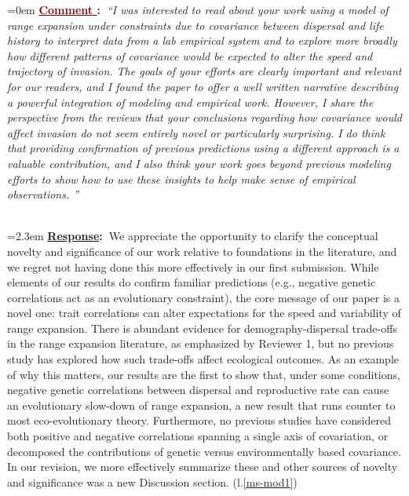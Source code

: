 \documentclass[12pt]{article}
\newcounter{cN}
\newcommand{\comment}[1]{
	\vspace{2em}
	\refstepcounter{cN} %
	\noindent \hangindent=0em \textbf{\textcolor{Maroon}{\uline{Comment \thecN}:~}}\emph{``#1''}
	}
\newcommand{\response}[1]{
	\\[0.25em]
	\hangindent=2.3em \textbf{\textcolor{NavyBlue}{\uline{Response}:~}}#1
	}
\begin{document}
\comment{I was interested to read about your work using a model of range expansion under constraints due to covariance between dispersal and life history to interpret data from a lab empirical system and to explore more broadly how different patterns of covariance would be expected to alter the speed and trajectory of invasion.
The goals of your efforts are clearly important and relevant for our readers, and I found the paper to offer a well written narrative describing a powerful integration of modeling and empirical work.
However, I share the perspective from the reviews that your conclusions regarding how covariance would affect invasion do not seem entirely novel or particularly surprising.
I do think that providing confirmation of previous predictions using a different approach is a valuable contribution, and I also think your work goes beyond previous modeling efforts to show how to use these insights to help make sense of empirical observations. }
\response{We appreciate the opportunity to clarify the conceptual novelty and significance of our work relative to foundations in the literature, and we regret not having done this more effectively in our first submission.
While elements of our results do confirm familiar predictions (e.g., negative genetic correlations act as an evolutionary constraint), the core message of our paper is a novel one: trait correlations can alter expectations for the speed and variability of range expansion.
There is abundant evidence for demography-dispersal trade-offs in the range expansion literature, as emphasized by Reviewer 1, but no previous study has explored how such trade-offs affect ecological outcomes.
As an example of why this matters, our results are the first to show that, under some conditions, negative genetic correlations between dispersal and reproductive rate can cause an evolutionary slow-down of range expansion, a new result that runs counter to most eco-evolutionary theory.
Furthermore, no previous studies have considered both positive and negative correlations spanning a single axis of covariation, or decomposed the contributions of genetic versus environmentally based covariance.
In our revision, we more effectively summarize these and other sources of novelty and significance was a new Discussion section. (l.\ref{ms-mod1})}
\end{document}
